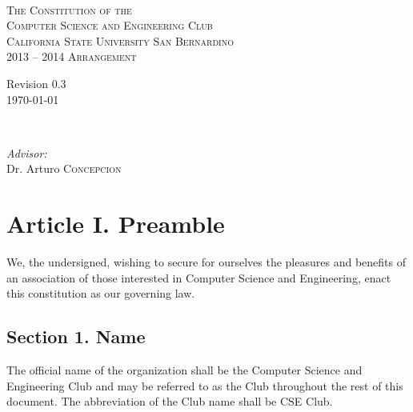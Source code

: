 \documentclass{article}
\begin{document}
\begin{titlepage}
\begin{center}

~ \\[2cm]
\textsc{\LARGE The Constitution of the}\\[0.5cm]
\textsc{\LARGE Computer Science and Engineering Club}\\[1.0cm]
\textsc{\large California State University San Bernardino}\\[5cm]
\textsc{\Large 2013 -- 2014 Arrangement}\\[10cm]

\begin{minipage}{0.4\textwidth}
\begin{flushleft} \large
Revision 0.3 \\
\today
\end{flushleft}
\end{minipage}
~
\begin{minipage}{0.55\textwidth}
\begin{flushright} \large
\emph{Advisor:} \\
Dr. Arturo \textsc{Concepcion}\\
\end{flushright}
\end{minipage}
\end{center}
\end{titlepage}

\newpage
\tableofcontents

\newpage

\section{Article I. Preamble}
  We, the undersigned, wishing to secure for ourselves the pleasures and benefits of an association of those interested in Computer Science and Engineering, enact this constitution as our governing law.

  \subsection{Section 1. Name}
    The official name of the organization shall be the Computer Science and Engineering Club and may be referred to as the Club throughout the rest of this document. The abbreviation of the Club name shall be CSE Club.
\end{document}
